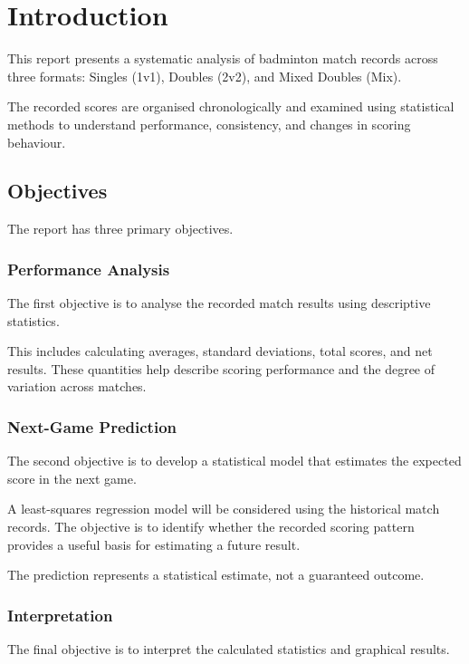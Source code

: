 
\section{Introduction}

This report presents a systematic analysis of badminton
match records across three formats: Singles (1v1),
Doubles (2v2), and Mixed Doubles (Mix).

The recorded scores are organised chronologically and
examined using statistical methods to understand
performance, consistency, and changes in scoring
behaviour.

\subsection{Objectives}

The report has three primary objectives.

\subsubsection{Performance Analysis}

The first objective is to analyse the recorded match
results using descriptive statistics.

This includes calculating averages, standard deviations,
total scores, and net results. These quantities help
describe scoring performance and the degree of
variation across matches.

\subsubsection{Next-Game Prediction}

The second objective is to develop a statistical model
that estimates the expected score in the next game.

A least-squares regression model will be considered
using the historical match records. The objective is
to identify whether the recorded scoring pattern
provides a useful basis for estimating a future result.

The prediction represents a statistical estimate,
not a guaranteed outcome.

\subsubsection{Interpretation}

The final objective is to interpret the calculated
statistics and graphical results.

